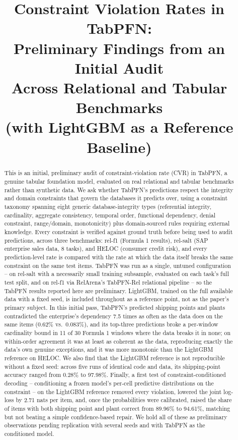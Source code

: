 \documentclass[11pt]{article}
\title{Constraint Violation Rates in TabPFN:\\Preliminary Findings from an Initial Audit\\Across Relational and Tabular Benchmarks\\\large (with LightGBM as a Reference Baseline)}
\author{}
\date{}
\begin{document}
\maketitle

\begin{abstract}
This is an initial, preliminary audit of constraint-violation rate (CVR) in TabPFN, a genuine
tabular foundation model, evaluated on real relational and tabular benchmarks rather than
synthetic data. We ask whether TabPFN's predictions respect the integrity and domain
constraints that govern the databases it predicts over, using a constraint taxonomy spanning
eight generic database-integrity types (referential integrity, cardinality, aggregate
consistency, temporal order, functional dependency, denial constraint, range/domain,
monotonicity) plus domain-sourced rules requiring external knowledge. Every constraint is
verified against ground truth before being used to audit predictions, across three benchmarks:
rel-f1 (Formula 1 results), rel-salt (SAP enterprise sales data, 8 tasks), and HELOC (consumer
credit risk), and every prediction-level rate is compared with the rate at which the data itself
breaks the same constraint on the same test items. TabPFN was run as a single, untuned
configuration -- on rel-salt with a necessarily small training subsample, evaluated on each
task's full test split, and on rel-f1 via RelArena's TabPFN-Rel relational pipeline -- so the
TabPFN results reported here are preliminary. LightGBM, trained on the full available data with
a fixed seed, is included throughout as a reference point, not as the paper's primary subject.
In this initial pass, TabPFN's predicted shipping points and plants contradicted the
enterprise's dependency 7.5 times as often as the data does on the same items (0.62\% vs.\
0.083\%), and its top-three predictions broke a per-window cardinality bound in 11 of 30
Formula 1 windows where the data breaks it in none; on within-order agreement it was at least as
coherent as the data, reproducing exactly the data's own genuine exceptions, and it was more
monotonic than the LightGBM reference on HELOC. We also find that the LightGBM reference is not
reproducible without a fixed seed: across five runs of identical code and data, its
shipping-point accuracy ranged from 0.28\% to 97.98\%. Finally, a first test of
constraint-conditioned decoding -- conditioning a frozen model's per-cell predictive
distributions on the constraint -- on the LightGBM reference removed every violation, lowered the
joint log-loss by 2.71 nats per item, and, once the probabilities were calibrated, raised the
share of items with both shipping point and plant correct from 89.96\% to 94.61\%, matching but
not beating a simple confidence-based repair. We hold all of these as preliminary observations
pending replication with several seeds and with TabPFN as the conditioned model.
\end{abstract}
\end{document}
